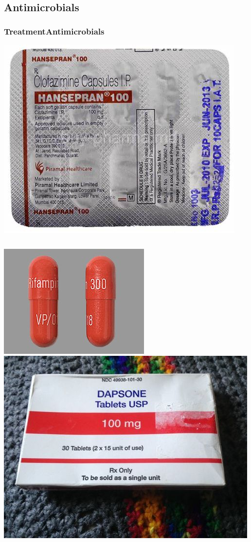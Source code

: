 \documentclass{beamer}
\begin{document}
\subsection{Antimicrobials}
	\begin{frame}
	\frametitle{Treatment\textemdash Antimicrobials}
		\begin{center}		
		\includegraphics[height=0.35\textheight,keepaspectratio]{clofazimine-02.jpeg}
		\begin{columns}
			\centering
			\includegraphics[height=.33\textheight,keepaspectratio]{rifampin.jpg}
			\centering
			\includegraphics[height=.33\textheight,keepaspectratio]{dapsone.jpg}

\end{columns}
\end{center}
\end{frame}
\end{document}
